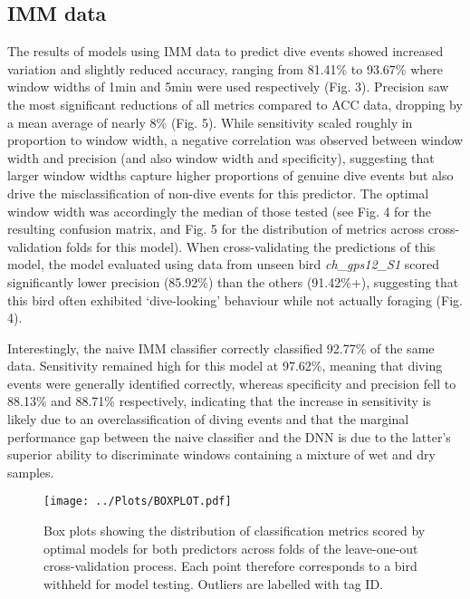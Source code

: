 \documentclass[11pt]{article}
\begin{document}
    \subsection{IMM data}
    The results of models using IMM data to predict dive events showed increased variation and slightly reduced accuracy, ranging from 81.41\% to 93.67\% where window widths of 1min and 5min were used respectively (Fig. 3). Precision saw the most significant reductions of all metrics compared to ACC data, dropping by a mean average of nearly 8\% (Fig. 5). While sensitivity scaled roughly in proportion to window width, a negative correlation was observed between window width and precision (and also window width and specificity), suggesting that larger window widths capture higher proportions of genuine dive events but also drive the misclassification of non-dive events for this predictor. The optimal window width was accordingly the median of those tested (see Fig. 4 for the resulting confusion matrix, and Fig. 5 for the distribution of metrics across cross-validation folds for this model). When cross-validating the predictions of this model, the model evaluated using data from unseen bird \emph{ch\_gps12\_S1} scored significantly lower precision (85.92\%) than the others (91.42\%+), suggesting that this bird often exhibited ‘dive-looking’ behaviour while not actually foraging (Fig. 4).
    
    Interestingly, the naive IMM classifier correctly classified 92.77\% of the same data. Sensitivity remained high for this model at 97.62\%, meaning that diving events were generally identified correctly, whereas specificity and precision fell to 88.13\% and 88.71\% respectively, indicating that the increase in sensitivity is likely due to an overclassification of diving events and that the marginal performance gap between the naive classifier and the DNN is due to the latter's superior ability to discriminate windows containing a mixture of wet and dry samples.
    
    \begin{figure}[t!]
	    \centering\texttt{[image: ../Plots/BOXPLOT.pdf]}
	    \caption{Box plots showing the distribution of classification metrics scored by optimal models for both predictors across folds of the leave-one-out cross-validation process. Each point therefore corresponds to a bird withheld for model testing. Outliers are labelled with tag ID.}
    \end{figure}
    
\end{document}
